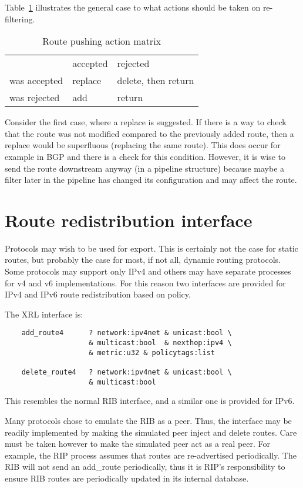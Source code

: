 \documentclass{article}
\begin{document}
Table~\ref{pushmatrix} illustrates the general case to what actions should be
taken on re-filtering.
\begin{table}
\begin{tabular}{l l l}
               & accepted & rejected \\
was accepted   & replace  & delete, then return \\
was rejected   & add      & return \\
\end{tabular}
\caption{\label{pushmatrix}Route pushing action matrix}
\end{table}
Consider the first case, where a replace is suggested. If there is a way to
check that the route was not modified compared to the previously added route,
then a replace would be superfluous (replacing the same route). This does occur
for example in BGP and there is a check for this condition. However, it is wise
to send the route downstream anyway (in a pipeline structure) because maybe a
filter later in the pipeline has changed its configuration and may affect the
route.

\section{Route redistribution interface}
Protocols may wish to be used for export. This is certainly not the case for
static routes, but probably the case for most, if not all, dynamic routing
protocols. Some protocols may support only IPv4 and others may have separate
processes for v4 and v6 implementations. For this reason two interfaces are
provided for IPv4 and IPv6 route redistribution based on policy.

The XRL interface is:
\begin{verbatim}
    add_route4      ? network:ipv4net & unicast:bool \
                    & multicast:bool  & nexthop:ipv4 \ 
                    & metric:u32 & policytags:list

    delete_route4   ? network:ipv4net & unicast:bool \
                    & multicast:bool
\end{verbatim}
This resembles the normal RIB interface, and a similar one is provided for IPv6.

Many protocols chose to emulate the RIB as a peer. Thus, the interface may be
readily implemented by making the simulated peer inject and delete routes. Care
must be taken however to make the simulated peer act as a real peer. For
example, the RIP process assumes that routes are re-advertised periodically. The
RIB will not send an add\_route periodically, thus it is RIP's responsibility to
ensure RIB routes are periodically updated in its internal database.
\end{document}
